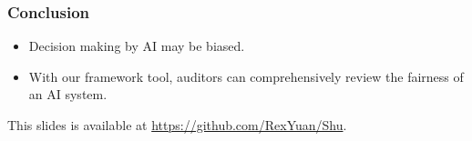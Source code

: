 \documentclass{beamer}
\begin{document}
\begin{frame}
    \frametitle{Conclusion}
    \begin{itemize}
        \item Decision making by AI may be biased.
        \item With our framework tool, auditors can comprehensively
        review the fairness of an AI system.
    \end{itemize}

    This slides is available at \url{https://github.com/RexYuan/Shu}.
\end{frame}
\end{document}
